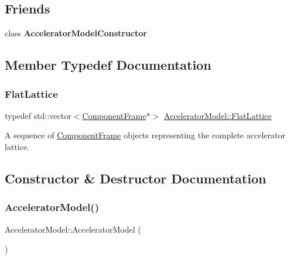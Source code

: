 \subsection*{Friends}
\begin{DoxyCompactItemize}
\item 
\mbox{\label{classAcceleratorModel_add246d96861a1c983714568729f7edb9}} 
class {\bfseries Accelerator\+Model\+Constructor}
\end{DoxyCompactItemize}


\subsection{Member Typedef Documentation}
\mbox{\label{classAcceleratorModel_a94e1f92813c1d6f73d67b1fc0b117b57}} 
\subsubsection{\texorpdfstring{Flat\+Lattice}{FlatLattice}}
{\footnotesize\ttfamily typedef std\+::vector$<$\hyperlink{classComponentFrame}{Component\+Frame}$\ast$$>$ \hyperlink{classAcceleratorModel_a94e1f92813c1d6f73d67b1fc0b117b57}{Accelerator\+Model\+::\+Flat\+Lattice}}

A sequence of \hyperlink{classComponentFrame}{Component\+Frame} objects representing the complete accelerator lattice. 

\subsection{Constructor \& Destructor Documentation}
\mbox{\label{classAcceleratorModel_a6a9e7ceecf090ae7b8039eb45ab897e0}} 
\subsubsection{\texorpdfstring{Accelerator\+Model()}{AcceleratorModel()}}
{\footnotesize\ttfamily Accelerator\+Model\+::\+Accelerator\+Model (\begin{DoxyParamCaption}{ }\end{DoxyParamCaption})}

